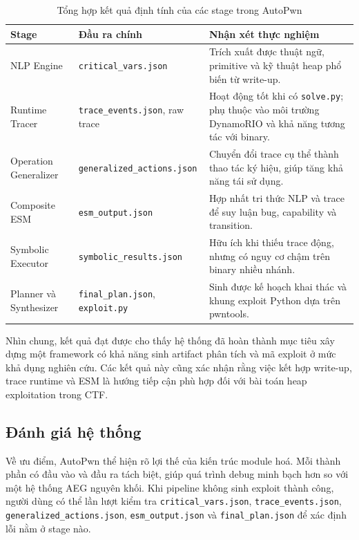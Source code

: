 \documentclass[final]{hcmuitthesis}
\begin{document}
\begin{table}[H]
\centering
\renewcommand{\arraystretch}{1.25}
\begin{tabular}{|p{3.2cm}|p{4.8cm}|p{5.2cm}|}
\hline
\textbf{Stage} & \textbf{Đầu ra chính} & \textbf{Nhận xét thực nghiệm} \\
\hline
NLP Engine & \texttt{critical\_vars.json} & Trích xuất được thuật ngữ, primitive và kỹ thuật heap phổ biến từ write-up. \\
\hline
Runtime Tracer & \texttt{trace\_events.json}, raw trace & Hoạt động tốt khi có \texttt{solve.py}; phụ thuộc vào môi trường DynamoRIO và khả năng tương tác với binary. \\
\hline
Operation Generalizer & \texttt{generalized\_actions.json} & Chuyển đổi trace cụ thể thành thao tác ký hiệu, giúp tăng khả năng tái sử dụng. \\
\hline
Composite ESM & \texttt{esm\_output.json} & Hợp nhất tri thức NLP và trace để suy luận bug, capability và transition. \\
\hline
Symbolic Executor & \texttt{symbolic\_results.json} & Hữu ích khi thiếu trace động, nhưng có nguy cơ chậm trên binary nhiều nhánh. \\
\hline
Planner và Synthesizer & \texttt{final\_plan.json}, \texttt{exploit.py} & Sinh được kế hoạch khai thác và khung exploit Python dựa trên pwntools. \\
\hline
\end{tabular}
\caption{Tổng hợp kết quả định tính của các stage trong AutoPwn}
\end{table}

Nhìn chung, kết quả đạt được cho thấy hệ thống đã hoàn thành mục tiêu xây dựng một framework có khả năng sinh artifact phân tích và mã exploit ở mức khả dụng nghiên cứu. Các kết quả này cũng xác nhận rằng việc kết hợp write-up, trace runtime và ESM là hướng tiếp cận phù hợp đối với bài toán heap exploitation trong CTF.

\subsection{Đánh giá hệ thống}
Về ưu điểm, AutoPwn thể hiện rõ lợi thế của kiến trúc module hoá. Mỗi thành phần có đầu vào và đầu ra tách biệt, giúp quá trình debug minh bạch hơn so với một hệ thống AEG nguyên khối. Khi pipeline không sinh exploit thành công, người dùng có thể lần lượt kiểm tra \texttt{critical\_vars.json}, \texttt{trace\_events.json}, \texttt{generalized\_actions.json}, \texttt{esm\_output.json} và \texttt{final\_plan.json} để xác định lỗi nằm ở stage nào.
\end{document}
